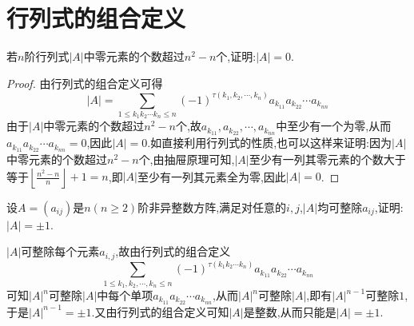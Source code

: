 \documentclass[../../main.tex]{subfiles}
\begin{document}
\section{行列式的组合定义}

\begin{example}
若\(n\)阶行列式\(\vert A\vert\)中零元素的个数超过\(n^2 - n\)个,证明:\(\vert A\vert = 0\).
\end{example}
\begin{proof}
由行列式的组合定义可得
\[
|A|=\sum_{1\leq k_1k_2\cdots k_n\leq n}(-1)^{\tau (k_1,k_2,\cdots,k_n)}a_{k_{11}}a_{k_{22}}\cdots a_{k_{nn}}
\]
由于\(|A|\)中零元素的个数超过\(n^2 - n\)个,故\(a_{k_{11}},a_{k_{22}},\cdots,a_{k_{nn}}\)中至少有一个为零,从而\(a_{k_{11}}a_{k_{22}}\cdots a_{k_{nn}} = 0\),因此\(|A| = 0\).如直接利用行列式的性质,也可以这样来证明:因为\(|A|\)中零元素的个数超过\(n^2 - n\)个,由抽屉原理可知,\(|A|\)至少有一列其零元素的个数大于等于\(\left\lfloor\frac{n^2 - n}{n}\right\rfloor+ 1=n\),即\(|A|\)至少有一列其元素全为零,因此\(|A| = 0\).
\end{proof}

\begin{example}
设\(A=(a_{ij})\)是\(n(n\geq2)\)阶非异整数方阵,满足对任意的\(i,j\),\(\vert A\vert\)均可整除\(a_{ij}\),证明:\(\vert A\vert=\pm1\).
\end{example}
\begin{solution}
\(\vert A\vert\)可整除每个元素\(a_{i,j}\),故由行列式的组合定义
\[
\sum_{1\le k_1,k_2,\cdots ,k_n\le n}{\left( -1 \right) ^{\tau \left( k_1k_2\cdots k_n \right)}a_{k_{11}}a_{k_{22}}\cdots a_{k_{nn}}}
\]
可知\(\vert A\vert^n\)可整除\(\vert A\vert\)中每个单项\(a_{k_{11}}a_{k_{22}}\cdots a_{k_{nn}}\),从而\(\vert A\vert^n\)可整除\(\vert A\vert\),即有\(\vert A\vert^{n - 1}\)可整除\(1\),于是\(\vert A\vert^{n - 1}=\pm1\).又由行列式的组合定义可知\(\vert A\vert\)是整数,从而只能是\(\vert A\vert=\pm1\).
\end{solution}
\end{document}
